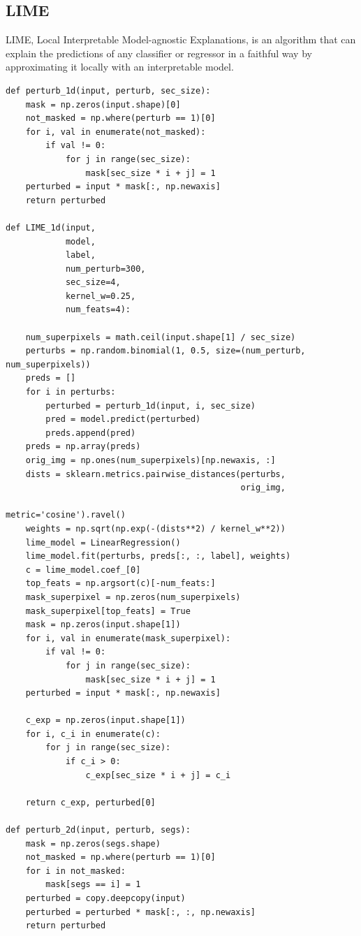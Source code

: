 \documentclass[conference]{IEEEtran}
\begin{document}
\subsection{LIME}

LIME, Local Interpretable Model-agnostic Explanations, is an algorithm that can explain the predictions of any classifier or regressor in a faithful way by approximating it locally with an interpretable model.

\begin{lstlisting}
def perturb_1d(input, perturb, sec_size):
    mask = np.zeros(input.shape)[0]
    not_masked = np.where(perturb == 1)[0]
    for i, val in enumerate(not_masked):
        if val != 0:
            for j in range(sec_size):
                mask[sec_size * i + j] = 1
    perturbed = input * mask[:, np.newaxis]
    return perturbed

def LIME_1d(input,
            model,
            label,
            num_perturb=300,
            sec_size=4,
            kernel_w=0.25,
            num_feats=4):

    num_superpixels = math.ceil(input.shape[1] / sec_size)
    perturbs = np.random.binomial(1, 0.5, size=(num_perturb, num_superpixels))
    preds = []
    for i in perturbs:
        perturbed = perturb_1d(input, i, sec_size)
        pred = model.predict(perturbed)
        preds.append(pred)
    preds = np.array(preds)
    orig_img = np.ones(num_superpixels)[np.newaxis, :]
    dists = sklearn.metrics.pairwise_distances(perturbs,
                                               orig_img,
                                               metric='cosine').ravel()
    weights = np.sqrt(np.exp(-(dists**2) / kernel_w**2))
    lime_model = LinearRegression()
    lime_model.fit(perturbs, preds[:, :, label], weights)
    c = lime_model.coef_[0]
    top_feats = np.argsort(c)[-num_feats:]
    mask_superpixel = np.zeros(num_superpixels)
    mask_superpixel[top_feats] = True
    mask = np.zeros(input.shape[1])
    for i, val in enumerate(mask_superpixel):
        if val != 0:
            for j in range(sec_size):
                mask[sec_size * i + j] = 1
    perturbed = input * mask[:, np.newaxis]

    c_exp = np.zeros(input.shape[1])
    for i, c_i in enumerate(c):
        for j in range(sec_size):
            if c_i > 0:
                c_exp[sec_size * i + j] = c_i

    return c_exp, perturbed[0]

def perturb_2d(input, perturb, segs):
    mask = np.zeros(segs.shape)
    not_masked = np.where(perturb == 1)[0]
    for i in not_masked:
        mask[segs == i] = 1
    perturbed = copy.deepcopy(input)
    perturbed = perturbed * mask[:, :, np.newaxis]
    return perturbed



\end{lstlisting}
\end{document}
